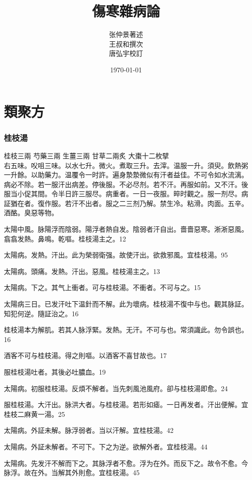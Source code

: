 \documentclass[b5paper,twoside,zihao=-4,UTF8]{ctexbook}
\title{傷寒雜病論}
\author{张仲景著述\\王叔和撰次\\唐弘宇校訂}
\date{\today}
\begin{document}
\maketitle
\tableofcontents%

\part{類聚方}

\section{桂枝湯}

桂枝{\scriptsize 三兩} 芍藥{\scriptsize 三兩} 生薑{\scriptsize 三兩} 甘草{\scriptsize 二兩炙} 大棗{\scriptsize 十二枚擘}\\
右五味。㕮咀三味。以水七升。微火。煮取三升。去滓。温服一升。須臾。飲熱粥一升餘。以助藥力。温覆令一时許。遍身漐漐微似有汗者益佳。不可令如水流漓。病必不除。若一服汗出病差。停後服。不必尽剂。若不汗。再服如前。又不汗。後服当小促其間。令半日許三服尽。病重者。一日一夜服。晬时觀之。服一剂尽。病証猶在者。復作服。若汗不出者。服之二三剂乃解。{禁生冷。粘滑。肉面。五辛。酒酪。臭惡等物。}

太陽中風。{脉}陽浮而陰弱。陽浮者熱自发。陰弱者汗自出。嗇嗇惡寒。淅淅惡風。翕翕发熱。鼻鳴。乾嘔。桂枝湯主之。12

太陽病。发熱。汗出。此为榮弱衛强。故使汗出。欲救邪風。宜桂枝湯。95

太陽病。頭痛。发熱。汗出。惡風。桂枝湯主之。13

太陽病。下之。其气上衝者。可与桂枝湯。不衝者。不可与之。15

太陽病三日。已发汗吐下温針而不解。此为壞病。桂枝湯不復中与也。觀其脉証。知犯何逆。隨証治之。16

桂枝湯本为解肌。若其人脉浮緊。发熱。无汗。不可与也。常須識此。勿令誤也。16

酒客不可与桂枝湯。得之則嘔。以酒客不喜甘故也。17

服桂枝湯吐者。其後必吐膿血。19

太陽病。初服桂枝湯。反煩不解者。当先刺風池風府。卻与桂枝湯即愈。24

服桂枝湯。大汗出。脉洪大者。与桂枝湯。若形如瘧。一日再发者。汗出便解。宜桂枝二麻黄一湯。25

太陽病。外証未解。脉浮弱者。当以汗解。宜桂枝湯。42

太陽病。外証未解者。不可下。下之为逆。欲解外者。宜桂枝湯。44

太陽病。先发汗不解而下之。其脉浮者不愈。浮为在外。而反下之。故令不愈。今脉浮。故在外。当解其外則愈。宜桂枝湯。45
\end{document}
